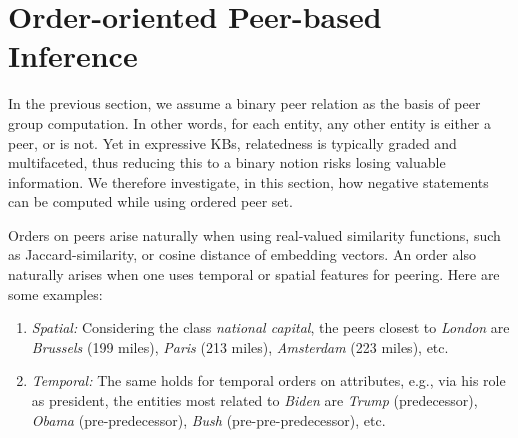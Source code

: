 \section{Order-oriented Peer-based Inference}
\label{sec:temporal}


In the previous section,  we assume a binary peer relation as the basis of peer group computation. In other words,  for each entity, any other entity is either a peer, or is not. Yet in expressive KBs, relatedness is typically graded and multifaceted, thus reducing this to a binary notion risks losing valuable information. We therefore investigate, in this section, how negative statements can be computed while using ordered peer set.

Orders on peers arise naturally when using real-valued similarity functions, such as Jaccard-similarity, or cosine distance of embedding vectors. An order also naturally arises when one uses temporal or spatial features for peering. Here are some examples:
\begin{enumerate}
    \item \emph{Spatial:} Considering the class \emph{national capital}, the peers closest to \textit{London} are \textit{Brussels} (199 miles), \textit{Paris} (213 miles), \textit{Amsterdam} (223 miles), etc.
    \item \emph{Temporal:} The same holds for temporal orders on attributes, e.g., via his role as president, the entities most related to \textit{Biden} are \textit{Trump} (predecessor), \textit{Obama} (pre-predecessor), \textit{Bush} (pre-pre-predecessor), etc.
\end{enumerate}

